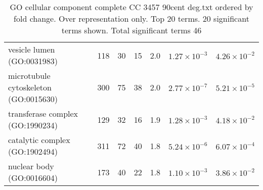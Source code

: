 \begin{table}[ht]
\begin{adjustbox}{width=\textwidth}
\begin{tabular}{lrrrrrr}
  vesicle lumen (GO:0031983) & 118 & 30 & 15 & 2.0 & $1.27 \times 10^{-3}$ & $4.26 \times 10^{-2}$ \\ 
  microtubule cytoskeleton (GO:0015630) & 300 & 75 & 38 & 2.0 & $2.77 \times 10^{-7}$ & $5.21 \times 10^{-5}$ \\ 
  transferase complex (GO:1990234) & 129 & 32 & 16 & 1.9 & $1.28 \times 10^{-3}$ & $4.18 \times 10^{-2}$ \\ 
  catalytic complex (GO:1902494) & 311 & 72 & 40 & 1.8 & $5.24 \times 10^{-6}$ & $6.07 \times 10^{-4}$ \\ 
  nuclear body (GO:0016604) & 173 & 40 & 22 & 1.8 & $1.10 \times 10^{-3}$ & $3.86 \times 10^{-2}$ \\ 
   \hline
\end{tabular}
\end{adjustbox}
\caption{GO cellular component complete CC 3457 90cent deg.txt ordered by fold change. Over representation only. Top 20 terms. 20 significant terms shown. Total significant terms 46} 
\label{tab:GO cellular component complete CC 3457 90cent deg.txt ordered by fold change. Over representation only. Top 20 terms. 20 significant terms shown. Total significant terms 46}
\end{table}




